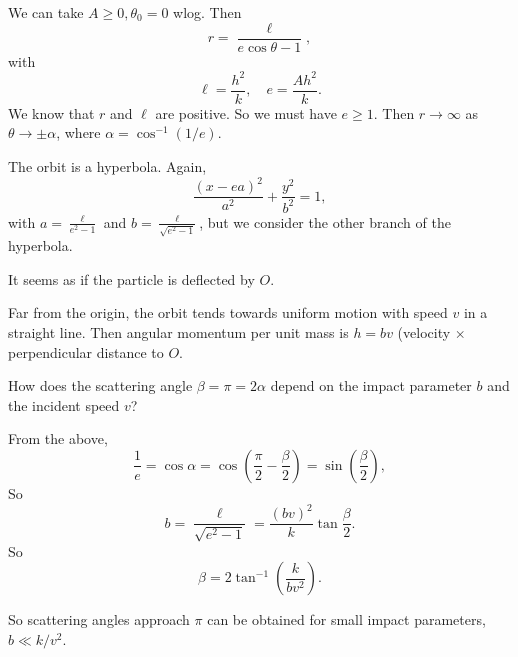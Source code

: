 \documentclass[a4paper]{article}
\begin{document}
We can take $A \geq 0, \theta_0 = 0$ wlog. Then
\[
  r = \frac{\ell}{e\cos \theta - 1},
\]
with
\[
  \ell = \frac{h^2}{k}, \quad e = \frac{Ah^2}{k}.
\]
We know that $r$ and $\ell$ are positive. So we must have $e \geq 1$. Then $r\to \infty$ as $\theta \to \pm \alpha$, where $\alpha = \cos^{-1}(1/e)$.

The orbit is a hyperbola. Again,
\[
  \frac{(x - ea)^2}{a^2} + \frac{y^2}{b^2} = 1,
\]
with $a = \frac{\ell}{e^2 - 1}$ and $b = \frac{\ell}{\sqrt{e^2 - 1}}$, but we consider the other branch of the hyperbola.
\begin{center}
\end{center}
It seems as if the particle is deflected by $O$.

Far from the origin, the orbit tends towards uniform motion with speed $v$ in a straight line. Then angular momentum per unit mass is $h = bv$ (velocity $\times$ perpendicular distance to $O$.

How does the scattering angle $\beta = \pi = 2\alpha$ depend on the impact parameter $b$ and the incident speed $v$?

From the above,
\[
  \frac{1}{e} = \cos \alpha = \cos \left(\frac{\pi}{2} - \frac{\beta}{2}\right) = \sin\left(\frac{\beta}{2}\right),
\]
So
\[
  b = \frac{\ell}{\sqrt{e^2 - 1}} = \frac{(bv)^2}{k}\tan \frac{\beta}{2}.
\]
So
\[
  \beta = 2\tan^{-1}\left(\frac{k}{bv^2}\right).
\]

So scattering angles approach $\pi$ can be obtained for small impact parameters, $b \ll k/v^2$.
\end{document}
